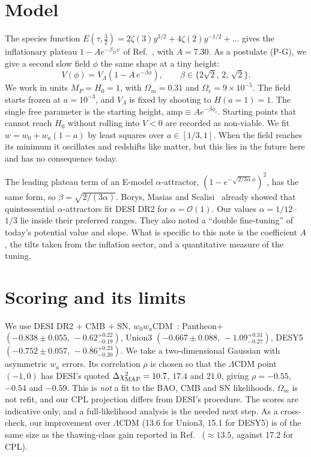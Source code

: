 \documentclass[aps,prd,twocolumn,superscriptaddress,nofootinbib,showkeys]{revtex4-2}
\begin{document}
\section{Model}
The species function $E(\tau,\tfrac32)=2\zeta(3)y^{3/2}+4\zeta(2)y^{-1/2}+\ldots$ gives the inflationary plateau $1-Ae^{-\beta_D\psi}$ of Ref.~\cite{P1}, with $A=7.30$. As a postulate (P-G), we give a second slow field $\phi$ the same shape at a tiny height:
\begin{equation}
V(\phi)=V_\Lambda\left(1-A\,e^{-\beta\phi}\right),\qquad \beta\in\{2\sqrt2,\,2,\,\sqrt2\}.
\end{equation}
We work in units $M_P=H_0=1$, with $\Omega_m=0.31$ and $\Omega_r=9\times10^{-5}$. The field starts frozen at $a=10^{-3}$, and $V_\Lambda$ is fixed by shooting to $H(a{=}1)=1$. The single free parameter is the starting height, $\mathrm{amp}\equiv Ae^{-\beta\phi_i}$. Starting points that cannot reach $H_0$ without rolling into $V<0$ are recorded as non-viable. We fit $w=w_0+w_a(1-a)$ by least squares over $a\in[1/3,1]$. When the field reaches its minimum it oscillates and redshifts like matter, but this lies in the future here and has no consequence today.

The leading plateau term of an E-model $\alpha$-attractor, $(1-e^{-\sqrt{2/3\alpha}\,\phi})^2$, has the same form, so $\beta=\sqrt{2/(3\alpha)}$. Borys, Masias and Scalisi~\cite{BMS} already showed that quintessential $\alpha$-attractors fit DESI DR2 for $\alpha=\mathcal O(1)$. Our values $\alpha=1/12$--$1/3$ lie inside their preferred ranges. They also noted a ``double fine-tuning'' of today's potential value and slope. What is specific to this note is the coefficient $A$, the tilts taken from the inflation sector, and a quantitative measure of the tuning.

\section{Scoring and its limits}
We use DESI DR2 + CMB + SN, $w_0w_a$CDM~\cite{DESI}: Pantheon+ $(-0.838\pm0.055,\,-0.62^{+0.22}_{-0.19})$, Union3 $(-0.667\pm0.088,\,-1.09^{+0.31}_{-0.27})$, DESY5 $(-0.752\pm0.057,\,-0.86^{+0.23}_{-0.20})$. We take a two-dimensional Gaussian with asymmetric $w_a$ errors. Its correlation $\rho$ is chosen so that the $\Lambda$CDM point $(-1,0)$ has DESI's quoted $\Delta\chi^2_{\rm MAP}=10.7$, $17.4$ and $21.0$, giving $\rho=-0.55$, $-0.54$ and $-0.59$.
This is \emph{not} a fit to the BAO, CMB and SN likelihoods. $\Omega_m$ is not refit, and our CPL projection differs from DESI's procedure. The scores are indicative only, and a full-likelihood analysis is the needed next step. As a cross-check, our improvement over $\Lambda$CDM (13.6 for Union3, 15.1 for DESY5) is of the same size as the thawing-class gain reported in Ref.~\cite{QP} ($\approx13.5$, against 17.2 for CPL).
\end{document}
